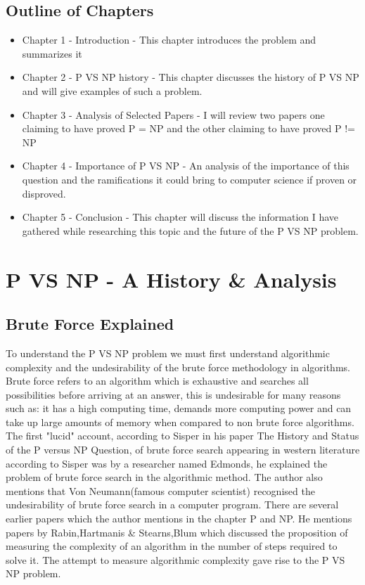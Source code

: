 \documentclass{report}
\begin{document}
\section{Outline of Chapters}
\begin{itemize}
  \item Chapter 1 - Introduction - This chapter introduces the problem and summarizes it
  \item  Chapter 2 - P VS NP history - This chapter discusses the history of P VS NP and will give examples of such a problem.
  \item Chapter 3 - Analysis of Selected Papers - I will review two papers one claiming to have proved P = NP and the other claiming to have proved P != NP
  \item Chapter 4 - Importance of P VS NP - An analysis of the importance of this question and the ramifications it could bring to computer science if proven or disproved.
  \item Chapter 5 - Conclusion - This chapter will discuss the information I have gathered while researching this topic and the future of the P VS NP problem.
\end{itemize}
\chapter{P VS NP - A History \& Analysis}
\section{Brute Force Explained}
To understand the P VS NP problem we must first understand algorithmic complexity and the undesirability of the brute force methodology in algorithms.
Brute force refers to an algorithm which is exhaustive and searches all possibilities before arriving at an answer, this is undesirable for many reasons such as: it has a high computing time, demands more computing power and can take up large amounts of memory when compared to non brute force algorithms.  The first "lucid" account, according to Sisper in his paper The History and Status of the P versus NP Question, of brute force search appearing in western literature according to Sisper was by a researcher named Edmonds\cite{HistoryOfPVsNP}, he explained the problem of brute force search in the algorithmic method.  The author also mentions that Von Neumann(famous computer scientist\cite{Neumann}) recognised the undesirability of brute force search in a computer program. There are several earlier papers which the author mentions in the chapter P and NP. He mentions papers by Rabin\cite{ResearchPaperRabin},Hartmanis \& Stearns\cite{ResearchPaperHartmanis},Blum\cite{ResearchPaperBlum} which discussed the proposition of measuring the complexity of an algorithm in the number of steps required to solve it. The attempt to measure algorithmic complexity gave rise to the P VS NP problem.
\end{document}
